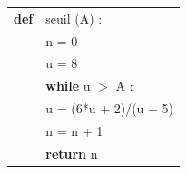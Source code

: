 \documentclass[10pt]{article}
\begin{document}
\begin{minipage}{0.43\linewidth}
\begin{center}
\begin{tabular}{|l l|}\hline
\textbf{def}&seuil (A) :\\
&n = 0\\
&u = 8\\
&\textbf{while} u $>$ A :\\
&\qquad u = (6*u + 2)/(u + 5)\\
&\qquad n = n + 1\\
&\textbf{return} n\\ \hline
\end{tabular}
\end{center}
\end{minipage}

\bigskip
\end{document}
